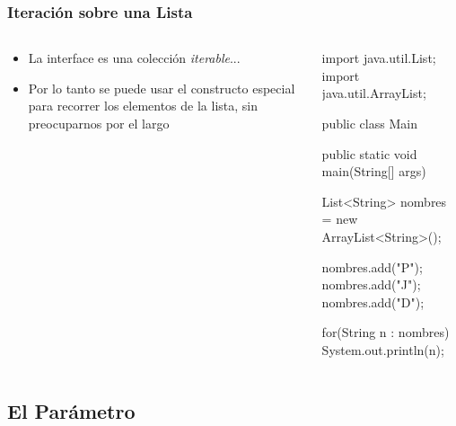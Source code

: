 \documentclass{beamer}
\begin{document}
\begin{frame}[fragile]
  \frametitle{Iteración sobre una Lista}

  \begin{columns}
    \begin{column}{0.4\textwidth}
        \begin{itemize}
        \item La interface  es una colección
          \emph{iterable}...
          
        \item Por lo tanto se puede usar el constructo 
          especial para recorrer los elementos de la lista, sin
          preocuparnos por el largo
          
        \end{itemize}
    \end{column}
    \begin{column}{0.6\textwidth}
      
      \begin{jsmall}
        import java.util.List;
        import java.util.ArrayList;
        
        public class Main {
          public static void main(String[] args) {
            List<String> nombres =
                new ArrayList<String>();

            nombres.add("P");
            nombres.add("J");
            nombres.add("D");

            for(String n : nombres) {
              System.out.println(n);
            }
          }
        }
      \end{jsmall}
      
    \end{column}
  \end{columns}

\end{frame}

\subsection{El Parámetro }
\end{document}
